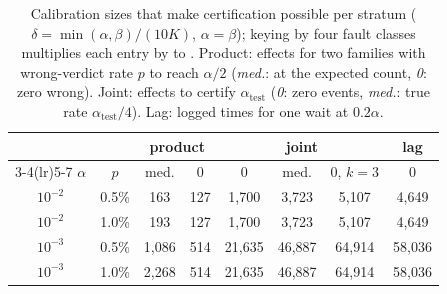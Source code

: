 \begin{table}[t]
\centering
\caption{Calibration sizes that make certification possible per stratum ($\delta{=}\min(\alpha,\beta)/(10K)$, $\alpha{=}\beta$); keying by four fault classes multiplies each entry by \NsizeKeyLo{} to \NsizeKeyHi. Product: effects for two families with wrong-verdict rate $p$ to reach $\alpha/2$ (\emph{med.}: at the expected count, \emph{0}: zero wrong). Joint: effects to certify $\alpha_{\mathrm{test}}$ (\emph{0}: zero events, \emph{med.}: true rate $\alpha_{\mathrm{test}}/4$). Lag: logged times for one wait at $0.2\alpha$.}
\label{tab:nsize}
\footnotesize
\setlength{\tabcolsep}{2.2pt}
\begin{tabular}{@{}cc cc ccc c@{}}
\toprule
 & & \multicolumn{2}{c}{product} & \multicolumn{3}{c}{joint} & lag \\
\cmidrule(lr){3-4}\cmidrule(lr){5-7}
$\alpha$ & $p$ & med. & 0 & 0 & med. & 0, $k{=}3$ & 0 \\
\midrule
$10^{-2}$ & 0.5\% & 163 & 127 & 1{,}700 & 3{,}723 & 5{,}107 & 4{,}649 \\
$10^{-2}$ & 1.0\% & 193 & 127 & 1{,}700 & 3{,}723 & 5{,}107 & 4{,}649 \\
$10^{-3}$ & 0.5\% & 1{,}086 & 514 & 21{,}635 & 46{,}887 & 64{,}914 & 58{,}036 \\
$10^{-3}$ & 1.0\% & 2{,}268 & 514 & 21{,}635 & 46{,}887 & 64{,}914 & 58{,}036 \\
\bottomrule
\end{tabular}
\end{table}
